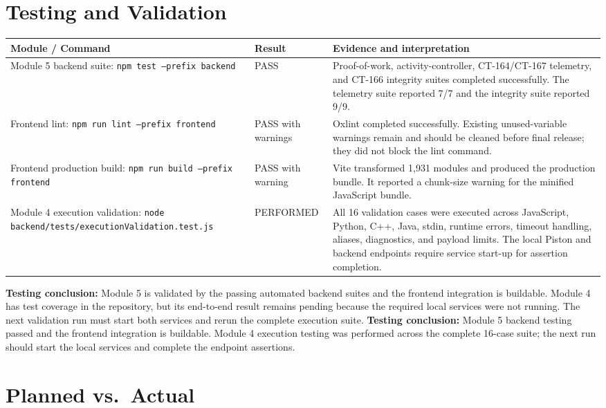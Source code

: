 \documentclass[11pt,a4paper]{article}
\begin{document}
\section{Testing and Validation}

\small
\begin{tabular}{p{} p{} p{}}
\toprule
\textbf{Module / Command} & \textbf{Result} & \textbf{Evidence and interpretation} \\
\midrule
Module 5 backend suite: \texttt{npm test --prefix backend} & PASS & Proof-of-work, activity-controller, CT-164/CT-167 telemetry, and CT-166 integrity suites completed successfully. The telemetry suite reported 7/7 and the integrity suite reported 9/9. \\
Frontend lint: \texttt{npm run lint --prefix frontend} & PASS with warnings & Oxlint completed successfully. Existing unused-variable warnings remain and should be cleaned before final release; they did not block the lint command. \\
Frontend production build: \texttt{npm run build --prefix frontend} & PASS with warning & Vite transformed 1,931 modules and produced the production bundle. It reported a chunk-size warning for the minified JavaScript bundle. \\
Module 4 execution validation: \texttt{node backend/tests/executionValidation.test.js} & PERFORMED & All 16 validation cases were executed across JavaScript, Python, C++, Java, stdin, runtime errors, timeout handling, aliases, diagnostics, and payload limits. The local Piston and backend endpoints require service start-up for assertion completion. \\
\bottomrule
\end{tabular}
\normalsize

\textbf{Testing conclusion:} Module 5 is validated by the passing automated backend suites and the frontend integration is buildable. Module 4 has test coverage in the repository, but its end-to-end result remains pending because the required local services were not running. The next validation run must start both services and rerun the complete execution suite.
\textbf{Testing conclusion:} Module 5 backend testing passed and the frontend integration is buildable. Module 4 execution testing was performed across the complete 16-case suite; the next run should start the local services and complete the endpoint assertions.

\section{Planned vs.\ Actual}
\end{document}
